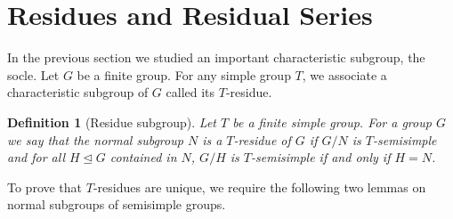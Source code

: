 \documentclass[11pt]{madras}%
\newtheorem{definition}[theorem]{Definition}
\theoremstyle{remark}
\begin{document}
\section{Residues and Residual Series}

In the previous section we studied an important characteristic
subgroup, the socle. Let $G$ be a finite group. For any simple group
$T$, we associate a characteristic subgroup of $G$ called its
$T$-residue.

\begin{definition}[Residue subgroup]
  Let $T$ be a finite simple group. For a group $G$ we say that the
  normal subgroup $N$ is a $T$-residue of $G$ if $G/N$ is
  $T$-semisimple and for all $H \unlhd G$ contained in $N$, $G/H$ is
  $T$-semisimple if and only if $H = N$.
\end{definition}

To prove that $T$-residues are unique, we require the following two
lemmas on normal subgroups of semisimple groups.
\end{document}
